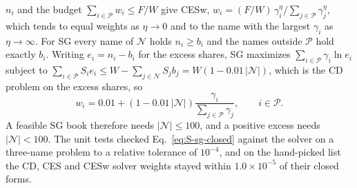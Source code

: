 $n_i$ and the budget $\sum_{i \in \mathcal{P}} w_i \le F/W$ give CESw,
$w_i = (F/W)\, \gamma_i^{\eta} / \sum_{j \in \mathcal{P}} \gamma_j^{\eta}$, which tends to equal weights as
$\eta \to 0$ and to the name with the largest $\gamma_i$ as $\eta \to \infty$. For SG every name of $\mathcal{N}$ holds
$n_i \ge b_i$ and the names outside $\mathcal{P}$ hold exactly $b_i$. Writing $e_i = n_i - b_i$ for the excess shares,
SG maximizes $\sum_{i \in \mathcal{P}} \gamma_i \ln e_i$ subject to
$\sum_{i \in \mathcal{P}} S_i e_i \le W - \sum_{j \in \mathcal{N}} S_j b_j = W (1 - 0.01\,\lvert\mathcal{N}\rvert)$,
which is the CD problem on the excess shares, so
\begin{equation}
w_i = 0.01 + \left( 1 - 0.01\,\lvert\mathcal{N}\rvert \right) \frac{\gamma_i}{\sum_{j \in \mathcal{P}} \gamma_j},
\qquad i \in \mathcal{P}.
\label{eq:S-sg-closed}
\end{equation}
A feasible SG book therefore needs $\lvert\mathcal{N}\rvert \le 100$, and a positive excess needs
$\lvert\mathcal{N}\rvert < 100$. The unit tests checked Eq.~\ref{eq:S-sg-closed} against the solver on a three-name
problem to a relative tolerance of $10^{-4}$, and on the hand-picked list the CD, CES and CESw solver weights stayed
within $1.0 \times 10^{-5}$ of their closed forms.


